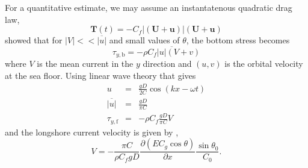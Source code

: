 For a quantitative estimate, we may assume an instantatenous quadratic drag law, 
\begin{equation}
    {\mathbf T}\left(t\right)=-C_f
    \left|\left({\mathbf U}+{\mathbf u}\right)\right|
    \left({\mathbf U}+{\mathbf u}\right)
\end{equation}
\cite{Longuet-Higgins1970} showed that for
$\left|V\right|<< \overline{\left|u\right|}$  and small values of 
$\theta$, the bottom stress becomes
\begin{equation}
    \tau_{y,{\mathrm b}}=- \overline{\rho C_f \left|u\right|\left(V+v\right)}\label{taub_LH70}
\end{equation}
where $V$ is the mean current in the  $y$ direction and  $\left(u,v\right)$ is the orbital velocity at the sea floor. Using linear wave theory that gives 
\begin{eqnarray}
    u& =& \frac{gD}{2C}\cos\left(kx-\omega t\right)\\
      \overline{\left|u\right|} & =& \frac{gD}{\pi C}\\
    \tau_{y,{\mathrm f}}&=&-\rho C_f \frac{gD}{\pi C} V
\end{eqnarray}
and the longshore current velocity is given by \citep{Thornton&Guza1986}, 
\begin{equation}
    V=- \frac{\pi C}{\rho C_f  g D}
    \frac{ \partial \left(E C_g \cos \theta\right)}{\partial x}
    \frac{\sin \theta_0}{C_0}.\label{TG86}
\end{equation}

